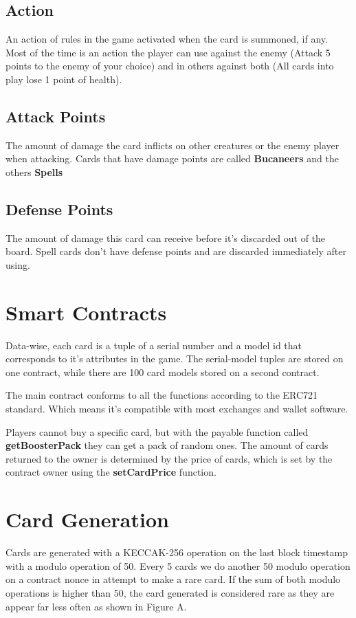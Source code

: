 \documentclass[11pt,twocolumn]{article}
\begin{document}
\subsection{Action}
An action of rules in the game activated when the card is summoned, if any. Most of the time is an action the player can use against the enemy (Attack 5 points to the enemy of your choice) and in others against both (All cards into play lose 1 point of health).

\subsection{Attack Points}
The amount of damage the card inflicts on other creatures or the enemy player when attacking. Cards that have damage points are called \textbf{Bucaneers} and the others \textbf{Spells}


\subsection{Defense Points}
The amount of damage this card can receive before it's discarded out of the board. Spell cards don't have defense points and are discarded immediately after using.

\clearpage

\section{Smart Contracts}

Data-wise, each card is a tuple of a serial number and a model id that corresponds to it's attributes in the game. The serial-model tuples are stored on one contract, while there are 100 card models stored on a second contract.

The main contract conforms to all the functions according to the ERC721 \cite{nft} standard. Which means it's compatible with most exchanges and wallet software. 

Players cannot buy a specific card, but with the payable function called \textbf{getBoosterPack} they can get a pack of random ones. The amount of cards returned to the owner is determined by the price of cards, which is set by the contract owner using the \textbf{setCardPrice} function.
\section{Card Generation}
Cards are generated with a KECCAK-256 operation on the last block timestamp with a modulo operation of 50. Every 5 cards we do another 50 modulo operation on a contract nonce in attempt to make a rare card. If the sum of both modulo operations is higher than 50, the card generated is considered rare as they are appear far less often as shown in Figure A.
\end{document}
